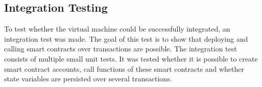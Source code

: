 \subsection{Integration Testing}
To test whether the virtual machine could be successfully integrated, an integration test was made. The goal of this test is to show that deploying and calling smart contracts over transactions are possible. The integration test consists of multiple small unit tests. It was tested whether it is possible to create smart contract accounts, call functions of these smart contracts and whether state variables are persisted over several transactions.
